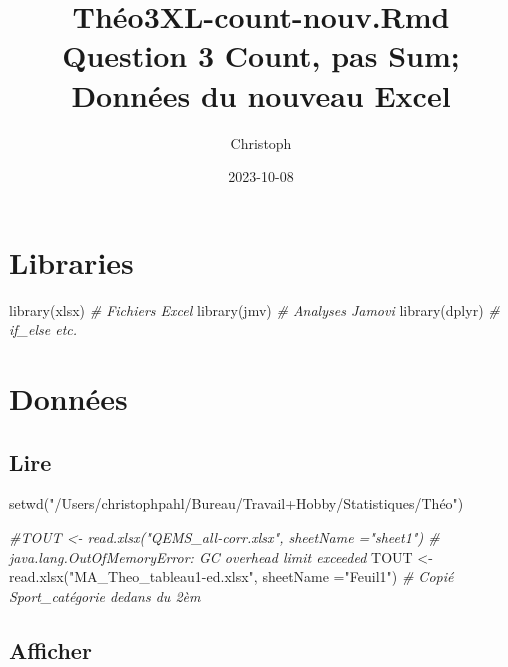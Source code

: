 \documentclass[
]{article}
\title{Théo3XL-count-nouv.Rmd Question 3 Count, pas Sum; Données du
nouveau Excel}
\author{Christoph}
\date{2023-10-08}
\newenvironment{Shaded}{\begin{snugshade}}{\end{snugshade}}
\newcommand{\AttributeTok}[1]{\textcolor[rgb]{0.77,0.63,0.00}{#1}}
\newcommand{\CommentTok}[1]{\textcolor[rgb]{0.56,0.35,0.01}{\textit{#1}}}
\newcommand{\FunctionTok}[1]{\textcolor[rgb]{0.00,0.00,0.00}{#1}}
\newcommand{\NormalTok}[1]{#1}
\newcommand{\OtherTok}[1]{\textcolor[rgb]{0.56,0.35,0.01}{#1}}
\newcommand{\StringTok}[1]{\textcolor[rgb]{0.31,0.60,0.02}{#1}}
\begin{document}
\maketitle

\hypertarget{libraries}{%
\section{Libraries}\label{libraries}}

\begin{Shaded}
\begin{Highlighting}[]
\FunctionTok{library}\NormalTok{(xlsx)                                         }\CommentTok{\# Fichiers Excel}
\FunctionTok{library}\NormalTok{(jmv)                                          }\CommentTok{\# Analyses Jamovi}
\FunctionTok{library}\NormalTok{(dplyr)                                        }\CommentTok{\# if\_else etc.}
\end{Highlighting}
\end{Shaded}

\hypertarget{donnuxe9es}{%
\section{Données}\label{donnuxe9es}}

\hypertarget{lire}{%
\subsection{Lire}\label{lire}}

\begin{Shaded}
\begin{Highlighting}[]
\FunctionTok{setwd}\NormalTok{(}\StringTok{"/Users/christophpahl/Bureau/Travail+Hobby/Statistiques/Théo"}\NormalTok{)}

\CommentTok{\#TOUT \textless{}{-} read.xlsx("QEMS\_all{-}corr.xlsx", sheetName ="sheet1")  \# java.lang.OutOfMemoryError: GC overhead limit exceeded}
\NormalTok{TOUT }\OtherTok{\textless{}{-}} \FunctionTok{read.xlsx}\NormalTok{(}\StringTok{"MA\_Theo\_tableau1{-}ed.xlsx"}\NormalTok{, }\AttributeTok{sheetName =}\StringTok{"Feuil1"}\NormalTok{)    }\CommentTok{\# Copié Sport\_catégorie dedans du 2èm}
\end{Highlighting}
\end{Shaded}

\hypertarget{afficher}{%
\subsection{Afficher}\label{afficher}}
\end{document}

